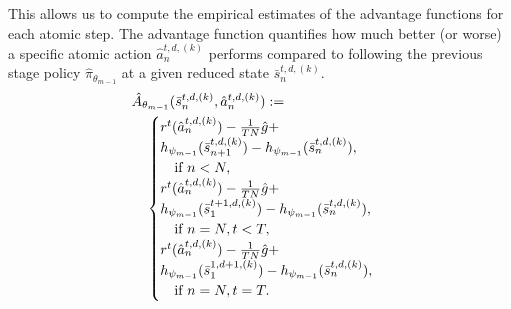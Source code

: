 This allows us to compute the empirical estimates of the advantage functions for each atomic step. The advantage function quantifies how much better (or worse) a specific atomic action \( \hat{a}^{t,d, (k)}_{n}\) performs compared to following the previous stage policy \( \hat{\pi}_{\theta_{m-1}} \) at a given reduced state \( \bar{s}^{t,d, (k)}_{n}\).
\begin{align} \label{eq:advantage}
    &\hat{A}_{\theta_{m-1}}(\bar{s}^{t,d, (k)}_{n}, \hat{a}^{t,d, (k)}_{n}) := \nonumber\\ 
    &\quad \begin{cases}
        r^t(\hat{a}^{t,d, (k)}_{n}) - \frac{1}{TN}\hat{g} + \\
        h_{\psi_{m-1}}(\bar{s}^{t,d, (k)}_{n + 1}) - h_{\psi_{m-1}}(\bar{s}^{t,d, (k)}_{n}), \\
        \quad \text{if } n < N,\\
        r^t(\hat{a}^{t,d, (k)}_{n}) - \frac{1}{TN}\hat{g} + \\
        h_{\psi_{m-1}}(\bar{s}^{t + 1,d, (k)}_{1}) - h_{\psi_{m-1}}(\bar{s}^{t,d, (k)}_{n}), \\
        \quad \text{if } n = N, t < T,\\
        r^t(\hat{a}^{t,d, (k)}_{n}) - \frac{1}{TN}\hat{g} + \\
        h_{\psi_{m-1}}(\bar{s}^{1,d+1, (k)}_{1}) - h_{\psi_{m-1}}(\bar{s}^{t,d, (k)}_{n}), \\
        \quad \text{if } n = N, t = T.\\
    \end{cases}
\end{align}




